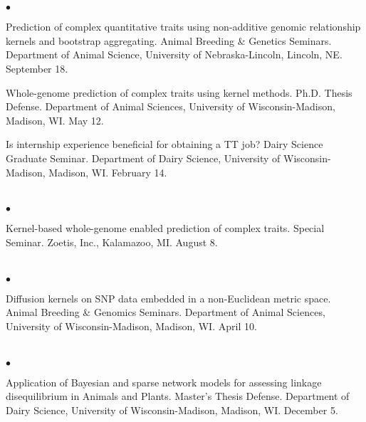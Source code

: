 \documentclass[margin,line,10pt]{res}
\newenvironment{list2}{
  \begin{list}{$\bullet$}{%
      \setlength{\itemsep}{0in}
      \setlength{\parsep}{0in} \setlength{\parskip}{0in}
      \setlength{\topsep}{0in} \setlength{\partopsep}{0in} 
      \setlength{\leftmargin}{0.2in}}}{\end{list}}
\begin{document}
\begin{resume}
\section{}
\begin{list2}
\item  Prediction of complex quantitative traits using non-additive genomic relationship kernels and bootstrap aggregating. Animal Breeding \& Genetics Seminars. Department of Animal Science, University of Nebraska-Lincoln, Lincoln, NE. September 18. 
\vspace{0.5cm}

\item Whole-genome prediction of complex traits using kernel methods. Ph.D. Thesis Defense. Department of Animal Sciences, University of Wisconsin-Madison, Madison, WI. May 12. 
\vspace{0.5cm}

\item Is internship experience beneficial for obtaining a TT job? Dairy Science Graduate Seminar. Department of Dairy Science, University of Wisconsin-Madison, Madison, WI. February 14. 
\end{list2}  

\section{}
\begin{list2}
\item  Kernel-based whole-genome enabled prediction of complex traits. Special Seminar.  Zoetis, Inc., Kalamazoo, MI. August 8. 
\end{list2}  

\section{}
\begin{list2}
 \item Diffusion kernels on SNP data embedded in a non-Euclidean metric space. Animal Breeding \& Genomics Seminars.  Department of Animal Sciences, University of Wisconsin-Madison, Madison, WI. April 10.
\end{list2}  

\section{}
\begin{list2}
\item  Application of Bayesian and sparse network models for assessing linkage disequilibrium in Animals and Plants. Master's Thesis Defense.  Department of Dairy Science, University of Wisconsin-Madison, Madison, WI. December 5. 
\end{list2}  


\end{resume}
\end{document}
